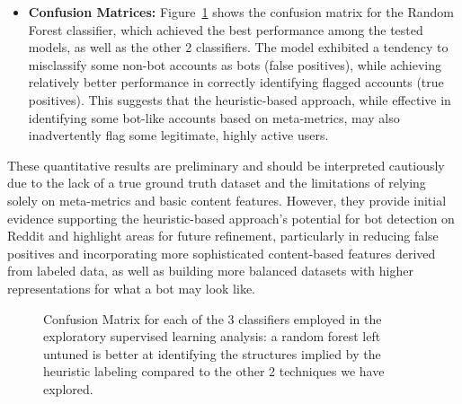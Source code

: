\documentclass[
  12pt,
  letterpaper,
  DIV=11,
  numbers=noendperiod]{scrartcl}
\providecommand{\tightlist}{%
  \setlength{\itemsep}{0pt}\setlength{\parskip}{0pt}}\usepackage{longtable,booktabs,array}
\begin{document}
\begin{itemize}
\tightlist
\item
  \textbf{Confusion Matrices:} Figure~\ref{fig-confmat} shows the
  confusion matrix for the Random Forest classifier, which achieved the
  best performance among the tested models, as well as the other 2
  classifiers. The model exhibited a tendency to misclassify some
  non-bot accounts as bots (false positives), while achieving relatively
  better performance in correctly identifying flagged accounts (true
  positives). This suggests that the heuristic-based approach, while
  effective in identifying some bot-like accounts based on meta-metrics,
  may also inadvertently flag some legitimate, highly active users.
\end{itemize}

These quantitative results are preliminary and should be interpreted
cautiously due to the lack of a true ground truth dataset and the
limitations of relying solely on meta-metrics and basic content
features. However, they provide initial evidence supporting the
heuristic-based approach's potential for bot detection on Reddit and
highlight areas for future refinement, particularly in reducing false
positives and incorporating more sophisticated content-based features
derived from labeled data, as well as building more balanced datasets
with higher representations for what a bot may look like.

\begin{figure}


\caption{\label{fig-confmat}Confusion Matrix for each of the 3
classifiers employed in the exploratory supervised learning analysis: a
random forest left untuned is better at identifying the structures
implied by the heuristic labeling compared to the other 2 techniques we
have explored.}

\end{figure}%
\end{document}
